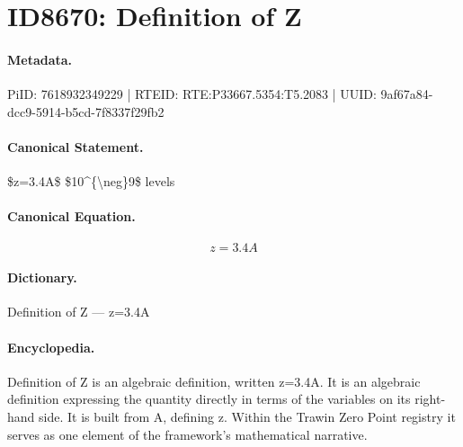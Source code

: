 \section*{ID8670: Definition of Z}
\paragraph{Metadata.}
PiID: 7618932349229 | RTEID: RTE:P33667.5354:T5.2083 | UUID: 9af67a84-dcc9-5914-b5cd-7f8337f29fb2

\paragraph{Canonical Statement.}
\$z=3.4A\$ \$10\textasciicircum{}\{\textbackslash{}neg\}9\$ levels

\paragraph{Canonical Equation.}
\[
z=3.4A
\]

\paragraph{Dictionary.}
Definition of Z — z=3.4A

\paragraph{Encyclopedia.}
Definition of Z is an algebraic definition, written z=3.4A. It is an algebraic definition expressing the quantity directly in terms of the variables on its right-hand side. It is built from A, defining z. Within the Trawin Zero Point registry it serves as one element of the framework's mathematical narrative.
